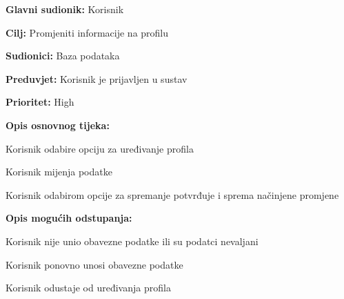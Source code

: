 \noindent {}
	\begin{packed_item}
	
		\item \textbf{Glavni sudionik:} Korisnik 
		\item  \textbf{Cilj:} Promjeniti informacije na profilu
		\item  \textbf{Sudionici:} Baza podataka
		\item  \textbf{Preduvjet:} Korisnik je prijavljen u sustav
		\item  \textbf{Prioritet:} High
		\item  \textbf{Opis osnovnog tijeka:}
		
		\item[] \begin{packed_enum}
			
			\item Korisnik odabire opciju za uređivanje profila 
			\item Korisnik mijenja podatke
			\item Korisnik odabirom opcije za spremanje potvrđuje i sprema načinjene promjene
		\end{packed_enum}
		\item  \textbf{Opis mogućih odstupanja:}
			
			\item[] \begin{packed_item}
				
				\item[3.a] Korisnik nije unio obavezne podatke ili su podatci nevaljani
				\item[] \begin{packed_enum}
					
					\item Korisnik ponovno unosi obavezne podatke
					\item Korisnik odustaje od uređivanja profila
					
				\end{packed_enum}		
			\end{packed_item}
	\end{packed_item}
    	
